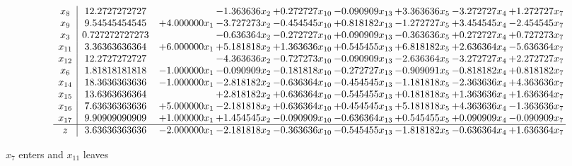 \documentclass[10pt]{article}
\begin{document}
 \[\begin{array}{c| c c@{\hskip 2pt} c@{\hskip 2pt} c@{\hskip 2pt} c@{\hskip 2pt} c@{\hskip 2pt} c@{\hskip 2pt} c@{\hskip 2pt} }
 x_{8}   &  12.2727272727  &   & -1.363636 x_{2} & + 0.272727 x_{10} & -0.090909 x_{13} & + 3.363636 x_{5} & -3.272727 x_{4} & + 1.272727 x_{7}\\
 x_{9}   &  9.54545454545 & + 4.000000 x_{1} & -3.727273 x_{2} & -0.454545 x_{10} & + 0.818182 x_{13} & -1.272727 x_{5} & + 3.454545 x_{4} & -2.454545 x_{7}\\
 x_{3}   &  0.727272727273  &   & -0.636364 x_{2} & -0.272727 x_{10} & + 0.090909 x_{13} & -0.363636 x_{5} & + 0.272727 x_{4} & + 0.727273 x_{7}\\
 x_{11}   &  3.36363636364 & + 6.000000 x_{1} & + 5.181818 x_{2} & + 1.363636 x_{10} & + 0.545455 x_{13} & + 6.818182 x_{5} & + 2.636364 x_{4} & -5.636364 x_{7}\\
 x_{12}   &  12.2727272727  &   & -4.363636 x_{2} & -0.727273 x_{10} & -0.090909 x_{13} & -2.636364 x_{5} & -3.272727 x_{4} & + 2.272727 x_{7}\\
 x_{6}   &  1.81818181818 & -1.000000 x_{1} & -0.090909 x_{2} & -0.181818 x_{10} & -0.272727 x_{13} & -0.909091 x_{5} & -0.818182 x_{4} & + 0.818182 x_{7}\\
 x_{14}   &  18.3636363636 & -1.000000 x_{1} & -2.818182 x_{2} & -0.636364 x_{10} & -0.454545 x_{13} & -1.181818 x_{5} & -2.363636 x_{4} & + 4.363636 x_{7}\\
 x_{15}   &  13.6363636364  &   & + 2.818182 x_{2} & + 0.636364 x_{10} & -0.545455 x_{13} & + 0.181818 x_{5} & + 1.363636 x_{4} & + 1.636364 x_{7}\\
 x_{16}   &  7.63636363636 & + 5.000000 x_{1} & -2.181818 x_{2} & + 0.636364 x_{10} & + 0.454545 x_{13} & + 5.181818 x_{5} & + 4.363636 x_{4} & -1.363636 x_{7}\\
 x_{17}   &  9.90909090909 & + 1.000000 x_{1} & + 1.454545 x_{2} & -0.090909 x_{10} & -0.636364 x_{13} & + 0.545455 x_{5} & + 0.090909 x_{4} & -0.090909 x_{7}\\
\hline
z    &  3.63636363636 & -2.000000 x_{1} & -2.181818 x_{2} & -0.363636 x_{10} & -0.545455 x_{13} & -1.818182 x_{5} & -0.636364 x_{4} & + 1.636364 x_{7}\\
\end{array}\]


 $ x_{7} $ enters and $ x_{11} $ leaves 
\end{document}
